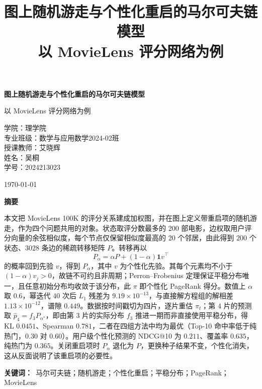 \documentclass[12pt,a4paper]{ctexart}
\title{\vspace{-1.2cm}\textbf{图上随机游走与个性化重启的马尔可夫链模型}\\[4pt]
\large 以 MovieLens 评分网络为例}
\author{}
\date{}
\begin{document}
\begin{titlepage}
\centering
\vspace*{2.2cm}
{\bfseries 图上随机游走与个性化重启的马尔可夫链模型\par}
\vspace{0.5cm}
{ 以 MovieLens 评分网络为例\par}
\vspace{3.2cm}
{
\centering
学\hspace{1em}院：理学院\\[10pt]
专业班级：数学与应用数学2024-02班\\[18pt]
授课教师：艾晓辉\\[18pt]
姓\hspace{1em}名：吴桐\\[18pt]
学\hspace{1em}号：2024213023\par}
\vfill
{\today\par}
\end{titlepage}

\begin{center}
{\bfseries 摘\quad 要}
\end{center}

本文把 MovieLens 100K 的评分关系建成加权图，并在图上定义带重启项的随机游走，作为四个问题共用的对象。状态取评分数最多的 200 部电影，边权取用户评分向量的余弦相似度，每个节点仅保留相似度最高的 20 个邻居，由此得到 $200$ 个状态、$3028$ 条边的稀疏转移矩阵 $P$。转移再以
\[
P_{\alpha}=\alpha P+(1-\alpha)\mathbf{1}v^{\top}
\]
的概率回到先验 $v$，得到 $P_{\alpha}$，其中 $v$ 为个性化先验。其每个元素均不小于 $(1-\alpha)v_j>0$，故链不可约且非周期；Perron--Frobenius 定理保证平稳分布唯一，且任意初始分布均收敛于该分布，此 $\pi$ 即个性化 PageRank 得分。数值上 $\alpha$ 取 $0.6$，幂迭代 40 次后 $L_1$ 残差为 $9.19\times10^{-13}$，与直接解方程组的解相差 $1.13\times10^{-12}$，谱隙 $0.449$。数据按时间戳切为四片，逐片重估 $\pi_t$；第 4 片的预测取 $\hat p_4=f_3P_{\alpha^*}$，即由第 3 片的实际分布 $f_3$ 推进一期而非直接使用平稳分布，得 KL $0.0451$、Spearman $0.781$，二者在四组方法中均为最优（Top-10 命中率低于纯热门，$0.30$ 对 $0.60$）。用户级个性化预测的 NDCG@10 为 $0.211$、覆盖率 $0.635$，纯热门为 $0.365$。关闭重启项时 $P_{\alpha}$ 退化为 $P$，更换种子结果不变，个性化消失，这从反面说明了该重启项的必要性。

\vspace{0.6em}
\noindent\textbf{关键词：}\ 马尔可夫链；随机游走；个性化重启；平稳分布；PageRank；MovieLens
\end{document}
